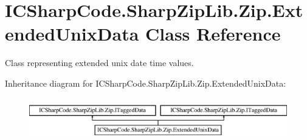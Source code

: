 \hypertarget{class_i_c_sharp_code_1_1_sharp_zip_lib_1_1_zip_1_1_extended_unix_data}{}\section{I\+C\+Sharp\+Code.\+Sharp\+Zip\+Lib.\+Zip.\+Extended\+Unix\+Data Class Reference}
\label{class_i_c_sharp_code_1_1_sharp_zip_lib_1_1_zip_1_1_extended_unix_data}


Class representing extended unix date time values.  


Inheritance diagram for I\+C\+Sharp\+Code.\+Sharp\+Zip\+Lib.\+Zip.\+Extended\+Unix\+Data\+:\begin{figure}[H]
\begin{center}
\leavevmode
\includegraphics[height=1.872910cm]{class_i_c_sharp_code_1_1_sharp_zip_lib_1_1_zip_1_1_extended_unix_data}
\end{center}
\end{figure}
